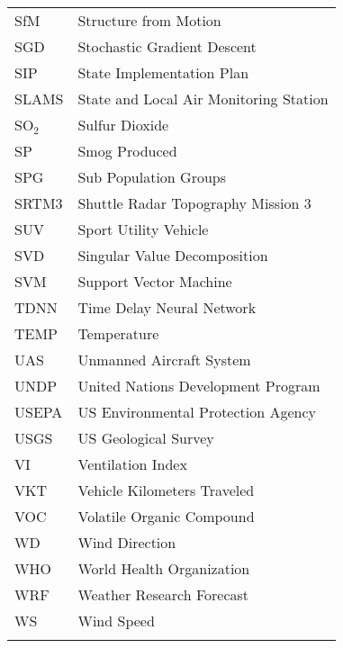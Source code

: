 \begin{longtable}{ll}
SfM & Structure from Motion \\
SGD & Stochastic Gradient Descent \\
SIP & State Implementation Plan \\
SLAMS & State and Local Air Monitoring Station \\
SO$_{2}$ & Sulfur Dioxide \\
SP & Smog Produced \\
SPG & Sub Population Groups \\
SRTM3 & Shuttle Radar Topography Mission 3 \\
SUV & Sport Utility Vehicle \\
SVD & Singular Value Decomposition \\
SVM & Support Vector Machine \\
TDNN & Time Delay Neural Network \\
TEMP & Temperature \\
UAS & Unmanned Aircraft System \\
UNDP & United Nations Development Program \\
USEPA & US Environmental Protection Agency \\
USGS & US Geological Survey \\
VI & Ventilation Index \\
VKT & Vehicle Kilometers Traveled \\
VOC & Volatile Organic Compound \\
WD & Wind Direction \\
WHO & World Health Organization \\
WRF & Weather Research Forecast \\
WS & Wind Speed \\
\\ \hline
\end{longtable}

\clearpage
